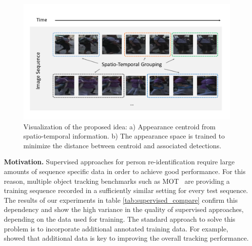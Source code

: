 \begin{figure}[t]
	\begin{center}
		\includegraphics[width=0.8\linewidth]{Fig_1_teaser.pdf}
	\end{center}
	\caption{Visualization of the proposed idea: a) Appearance centroid from spatio-temporal information. b) The appearance space is trained to minimize the distance between centroid and associated detections.}
	\label{fig:teaser}
\vspace*{-5mm}
\end{figure}
\noindent\textbf{Motivation.}
Supervised approaches for person re-identification require large amounts of sequence specific data in order to achieve good performance. For this reason, multiple object tracking benchmarks such as MOT~\cite{MOT16} are providing a training  sequence recorded in a sufficiently similar setting for every test sequence. The results of our experiments in table \ref{tab:supervised_compare} confirm this dependency and show the high variance in the quality of supervised approaches, depending on the data used for training. The standard approach to solve this problem is to incorporate additional annotated training data. For example, \cite{yoon2018online, feng2019multi} showed that additional data is key to improving the overall tracking performance.
